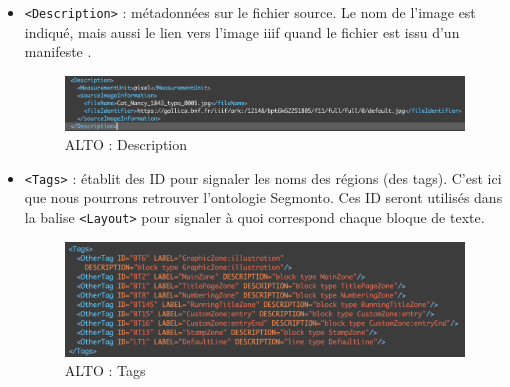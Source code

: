 \documentclass[a4paper,12pt,twoside]{book}
\begin{document}
\begin{itemize}
	\item \texttt{<Description>} : métadonnées sur le fichier source. Le nom de l'image est indiqué, mais aussi le lien vers l'image iiif quand le fichier est issu d'un manifeste .
	\begin{figure}[ht]
		\centering
		\includegraphics[scale=0.4]{description_alto.png}		
		\caption{ALTO : Description}
	\end{figure}

	\item \texttt{<Tags>} : établit des ID pour signaler les noms des régions (des tags). C'est ici que nous pourrons retrouver l'ontologie Segmonto. Ces ID seront utilisés dans la balise \texttt{<Layout>} pour signaler à quoi correspond chaque bloque de texte.
	\begin{figure}[ht]
		\centering
		\includegraphics[scale=0.5]{tags_alto.png}		
		\caption{ALTO : Tags}
	\end{figure}
	

\end{itemize}
\end{document}
